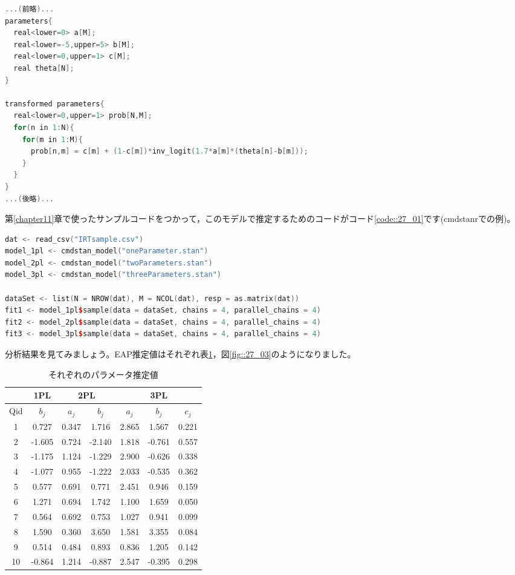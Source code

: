 \documentclass{ltjsbook}
\begin{document}
\begin{lstlisting}[language=C++,label={stan::27_03},caption={3PLモデル}]
...(前略)...
parameters{
  real<lower=0> a[M];
  real<lower=-5,upper=5> b[M];
  real<lower=0,upper=1> c[M];
  real theta[N];
}

transformed parameters{
  real<lower=0,upper=1> prob[N,M];
  for(n in 1:N){
    for(m in 1:M){
      prob[n,m] = c[m] + (1-c[m])*inv_logit(1.7*a[m]*(theta[n]-b[m]));
    }
  }
}
...(後略)...
\end{lstlisting}

第\ref{chapter11}章で使ったサンプルコードをつかって，このモデルで推定するためのコードがコード\ref{code::27_01}です(cmdstanrでの例)。
\begin{lstlisting}[language=c++,label={code::27_01},caption={IRTのコード}]
dat <- read_csv("IRTsample.csv")
model_1pl <- cmdstan_model("oneParameter.stan")
model_2pl <- cmdstan_model("twoParameters.stan")
model_3pl <- cmdstan_model("threeParameters.stan")

dataSet <- list(N = NROW(dat), M = NCOL(dat), resp = as.matrix(dat))
fit1 <- model_1pl$sample(data = dataSet, chains = 4, parallel_chains = 4)
fit2 <- model_2pl$sample(data = dataSet, chains = 4, parallel_chains = 4)
fit3 <- model_3pl$sample(data = dataSet, chains = 4, parallel_chains = 4)
\end{lstlisting}
分析結果を見てみましょう。EAP推定値はそれぞれ表\ref{tbl::27_01}，図\ref{fig::27_03}のようになりました。
\begin{table}[ht]
\caption{それぞれのパラメータ推定値}
\centering
\begin{tabular}[t]{c|c|cc|ccc}
\multicolumn{1}{c|}{} & \multicolumn{1}{c|}{1PL} & \multicolumn{2}{c|}{2PL} & \multicolumn{3}{c}{3PL} \\\hline
Qid & $b_j$ & $a_j$ & $b_j$ & $a_j$ & $b_j$ & $c_j$\\
\hline
1 & 0.727 & 0.347 & 1.716 & 2.865 & 1.567 & 0.221\\
2 & -1.605 & 0.724 & -2.140 & 1.818 & -0.761 & 0.557\\
3 & -1.175 & 1.124 & -1.229 & 2.900 & -0.626 & 0.338\\
4 & -1.077 & 0.955 & -1.222 & 2.033 & -0.535 & 0.362\\
5 & 0.577 & 0.691 & 0.771 & 2.451 & 0.946 & 0.159\\
6 & 1.271 & 0.694 & 1.742 & 1.100 & 1.659 & 0.050\\
7 & 0.564 & 0.692 & 0.753 & 1.027 & 0.941 & 0.099\\
8 & 1.590 & 0.360 & 3.650 & 1.581 & 3.355 & 0.084\\
9 & 0.514 & 0.484 & 0.893 & 0.836 & 1.205 & 0.142\\
10 & -0.864 & 1.214 & -0.887 & 2.547 & -0.395 & 0.298\\
\hline
\end{tabular}
\label{tbl::27_01}
\end{table}
\end{document}
